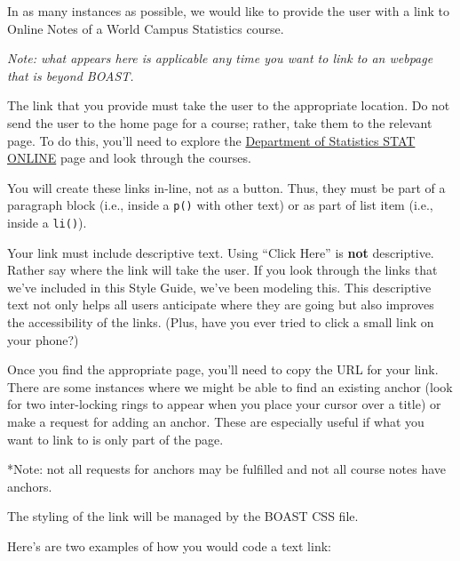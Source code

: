 \documentclass[
]{book}
\begin{document}
In as many instances as possible, we would like to provide the user with a link to Online Notes of a World Campus Statistics course.

\emph{Note: what appears here is applicable any time you want to link to an webpage that is beyond BOAST.}

The link that you provide must take the user to the appropriate location. Do not send the user to the home page for a course; rather, take them to the relevant page. To do this, you'll need to explore the \href{https://online.stat.psu.edu/statprogram/}{Department of Statistics STAT ONLINE} page and look through the courses.

You will create these links in-line, not as a button. Thus, they must be part of a paragraph block (i.e., inside a \texttt{p()} with other text) or as part of list item (i.e., inside a \texttt{li()}).

Your link must include descriptive text. Using ``Click Here'' is \textbf{not} descriptive. Rather say where the link will take the user. If you look through the links that we've included in this Style Guide, we've been modeling this. This descriptive text not only helps all users anticipate where they are going but also improves the accessibility of the links. (Plus, have you ever tried to click a small link on your phone?)

Once you find the appropriate page, you'll need to copy the URL for your link. There are some instances where we might be able to find an existing anchor (look for two inter-locking rings to appear when you place your cursor over a title) or make a request for adding an anchor. These are especially useful if what you want to link to is only part of the page.

*Note: not all requests for anchors may be fulfilled and not all course notes have anchors.

The styling of the link will be managed by the BOAST CSS file.

Here's are two examples of how you would code a text link:
\end{document}
